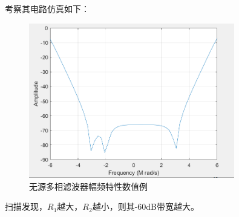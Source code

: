 \documentclass[12pt, a4paper]{article}
\begin{document}
    考察其电路仿真如下：
     \begin{figure}[H]
    	\centering
    	\includegraphics[width = 0.8\textwidth]{mag}
    	\caption{无源多相滤波器幅频特性数值例}
    \end{figure}\par
    扫描发现，$R_1$越大，$R_2$越小，则其-60dB带宽越大。
\end{document}
